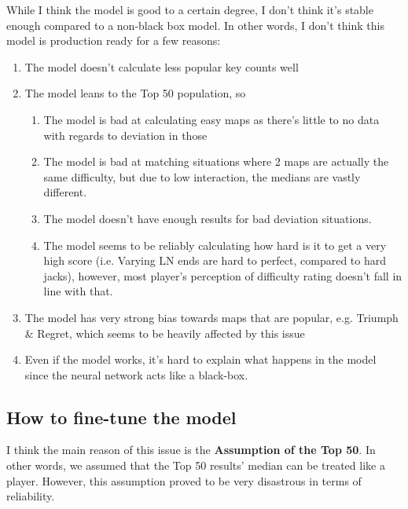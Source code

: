While I think the model is good to a certain degree, I don't think it's stable enough compared to a non-black box model. In other words, I don't think this model is production ready for a few reasons:

\begin{enumerate}
	\item The model doesn't calculate less popular key counts well
	\item The model leans to the Top 50 population, so
	\begin{enumerate}
		\item The model is bad at calculating easy maps as there's little to no data with regards to deviation in those
		\item The model is bad at matching situations where 2 maps are actually the same difficulty, but due to low interaction, the medians are vastly different.
		\item The model doesn't have enough results for bad deviation situations.
		\item The model seems to be reliably calculating how hard is it to get a very high score (i.e. Varying LN ends are hard to perfect, compared to hard jacks), however, most player's perception of difficulty rating doesn't fall in line with that.
	\end{enumerate}
	\item The model has very strong bias towards maps that are popular, e.g. Triumph \& Regret, which seems to be heavily affected by this issue
	\item Even if the model works, it's hard to explain what happens in the model since the neural network acts like a black-box.
\end{enumerate}

\subsection{How to fine-tune the model}

I think the main reason of this issue is the \textbf{Assumption of the Top 50}. In other words, we assumed that the Top 50 results' median can be treated like a player. However, this assumption proved to be very disastrous in terms of reliability.

